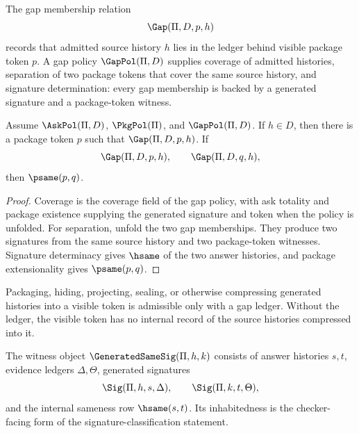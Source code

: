 \begin{definition}
\label{def:ask-sig-spine-gap-policy}
The gap membership relation
$$
\Gap(\Pi,D,p,h)
$$
records that admitted source history $h$ lies in the ledger behind visible
package token $p$.  A gap policy $\GapPol(\Pi,D)$ supplies coverage of
admitted histories, separation of two package tokens that cover the same
source history, and signature determination: every gap membership is backed
by a generated signature and a package-token witness.
\end{definition}

\begin{theorem}
\label{thm:ask-sig-spine-gap-coverage-separation}
Assume $\AskPol(\Pi,D)$, $\PkgPol(\Pi)$, and $\GapPol(\Pi,D)$.  If $h\in D$,
then there is a package token $p$ such that $\Gap(\Pi,D,p,h)$.  If
$$
\Gap(\Pi,D,p,h),
\qquad
\Gap(\Pi,D,q,h),
$$
then $\psame(p,q)$.
\end{theorem}

\begin{proof}
Coverage is the coverage field of the gap policy, with ask totality and
package existence supplying the generated signature and token when the
policy is unfolded.  For separation, unfold the two gap memberships.  They
produce two signatures from the same source history and two package-token
witnesses.  Signature determinacy gives $\hsame$ of the two answer histories,
and package extensionality gives $\psame(p,q)$.
\end{proof}

\begin{principle}
\label{prin:ask-sig-spine-compression-memory}
Packaging, hiding, projecting, sealing, or otherwise compressing generated
histories into a visible token is admissible only with a gap ledger.  Without
the ledger, the visible token has no internal record of the source histories
compressed into it.
\end{principle}


\begin{definition}
\label{def:ask-sig-spine-generated-samesig}
The witness object $\GeneratedSameSig(\Pi,h,k)$ consists of answer histories
$s,t$, evidence ledgers $\Delta,\Theta$, generated signatures
$$
\Sig(\Pi,h,s,\Delta),
\qquad
\Sig(\Pi,k,t,\Theta),
$$
and the internal sameness row $\hsame(s,t)$.  Its inhabitedness is the
checker-facing form of the signature-classification statement.
\end{definition}

